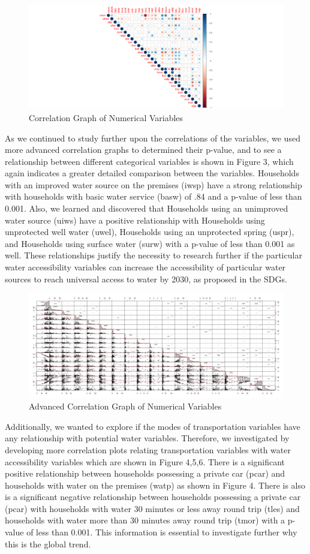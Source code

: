 \documentclass[10pt,twoside]{article}
\numberwithin{equation}{section}
\newcommand{\?}{\stackrel{?}{=}}
\begin{document}
\begin{figure}[h!]
  \centering
  \includegraphics[width=.7\textwidth]{correlation-basic}
  \caption{Correlation Graph of Numerical Variables}
  \label{fig:cor-basic}
\end{figure}
As we continued to study further upon the correlations of the variables, we used more advanced correlation graphs to determined their p-value, and to see a relationship between different categorical variables is shown in Figure 3, which again indicates a greater detailed comparison between the variables. Households with an improved water source on the premises (iwsp) have a strong relationship with households with basic water service (basw) of .84 and a p-value of less than 0.001. Also, we learned and discovered that Households using an unimproved water source (uiws) have a positive relationship with Households using unprotected well water (uwel), Households using an unprotected spring (uspr), and Households using surface water (surw) with a p-value of less than 0.001 as well. These relationships justify the necessity to research further if the particular water accessibility variables can increase the accessibility of particular water sources to reach universal access to water by 2030, as proposed in the SDGs. 



\begin{figure}[h!]
  \centering
  \includegraphics[width=.7\textwidth]{adv-cor-plot}
  \caption{Advanced Correlation Graph of Numerical Variables}
  \label{fig:cor-plot}
\end{figure}
Additionally, we wanted to explore if the modes of transportation variables have any relationship with potential water variables. Therefore, we investigated by developing more correlation plots relating transportation variables with water accessibility variables which are shown in Figure 4,5,6. There is a significant positive relationship between households possessing a private car (pcar) and households with water on the premises (watp) as shown in Figure 4. There is also is a significant negative relationship between households possessing a private car (pcar) with households with water 30 minutes or less away round trip (tles) and households with water more than 30 minutes away round trip (tmor) with a p-value of less than 0.001. This information is essential to investigate further why this is the global trend. 
\end{document}
